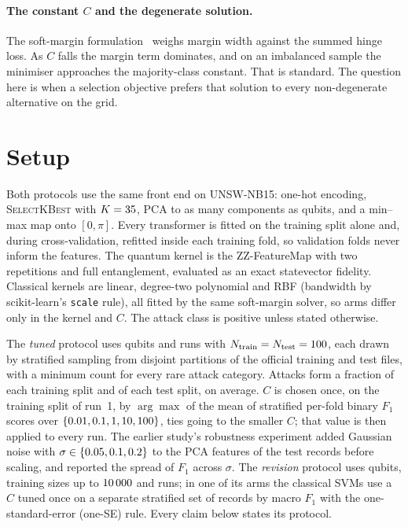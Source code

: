\documentclass[runningheads]{llncs}
\newcommand{\ZZ}{\textsf{ZZ}}
\newcommand{\Fone}{F_1}
\begin{document}
\paragraph{The constant $C$ and the degenerate solution.}
The soft-margin formulation~\cite{cortes1995svm} weighs margin width against
the summed hinge loss. As $C$ falls the margin term dominates, and on an
imbalanced sample the minimiser approaches the majority-class constant. That
is standard. The question here is when a selection objective prefers that
solution to every non-degenerate alternative on the grid.

\section{Setup}\label{sec:setup}

Both protocols use the same front end on UNSW-NB15: one-hot encoding,
\textsc{SelectKBest} with $K = 35$, PCA to as many components as
qubits, and a min--max map onto $[0,\pi]$. Every transformer is fitted on the
training split alone and, during cross-validation, refitted inside each
training fold, so validation folds never inform the features. The quantum
kernel is the \ZZ{}-FeatureMap with two repetitions and full entanglement,
evaluated as an exact statevector fidelity. Classical kernels are linear,
degree-two polynomial and RBF (bandwidth by scikit-learn's \texttt{scale}
rule), all fitted by the same soft-margin solver, so arms differ only in the
kernel and $C$. The attack class is positive unless stated otherwise.

The \emph{tuned} protocol uses \plegacyQubits{} qubits and \plegacySeeds{}
runs with $N_{\text{train}} = N_{\text{test}} = 100$, each drawn by
stratified sampling from disjoint partitions of the official training and test
files, with a minimum count for every rare attack category. Attacks form a
fraction \ptrainAttackRatio{} of each training split and \ptestAttackRatio{}
of each test split, on average. $C$ is chosen once, on the training split of run~1, by
$\arg\max$ of the mean of \pcvFolds{} stratified per-fold binary $\Fone$
scores over $\{0.01, 0.1, 1, 10, 100\}$, ties going to the smaller $C$; that value is then
applied to every run. The earlier study's robustness experiment added Gaussian
noise with $\sigma \in \{0.05, 0.1, 0.2\}$ to the PCA features of the test
records before scaling, and reported the spread of $\Fone$ across $\sigma$.
The \emph{revision} protocol uses \prevQubits{} qubits, training sizes up to
$10\,000$ and \prevRuns{} runs; in one of its arms the classical SVMs use a
$C$ tuned once on a separate stratified set of \prevTuneN{} records by macro $\Fone$ with the
one-standard-error (one-SE) rule. Every claim below states its protocol.
\end{document}
